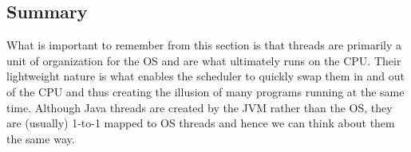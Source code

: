 \documentclass[main]{subfiles}
\begin{document}

\subsection{Summary}
What is important to remember from this section is that threads are primarily a unit of organization for the OS and are what ultimately runs on the CPU. Their lightweight nature is what enables the scheduler to quickly swap them in and out of the CPU and thus creating the illusion of many programs running at the same time. Although Java threads are created by the JVM rather than the OS, they are (usually) 1-to-1 mapped to OS threads and hence we can think about them the same way.
\end{document}
